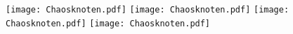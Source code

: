 \documentclass[a4paper]{minimal}
\begin{document}
\texttt{[image: Chaosknoten.pdf]}
\texttt{[image: Chaosknoten.pdf]}
\texttt{[image: Chaosknoten.pdf]}
\texttt{[image: Chaosknoten.pdf]}
\end{document}
